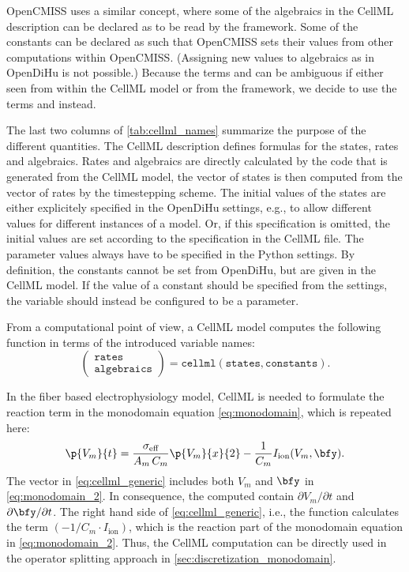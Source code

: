 OpenCMISS uses a similar concept, where some of the algebraics in the CellML description can be declared as  to be read by the framework. Some of the constants can be declared as  such that OpenCMISS sets their values from other computations within OpenCMISS. (Assigning new values to algebraics as in OpenDiHu is not possible.) Because the terms  and  can be ambiguous if either seen from within the CellML model or from the framework, we decide to use the terms  and  instead.

The last two columns of \cref{tab:cellml_names} summarize the purpose of the different quantities. The CellML description defines formulas for the states, rates and algebraics. Rates and algebraics are directly calculated by the code that is generated from the CellML model, the vector of states is then computed from the vector of rates by the timestepping scheme. The initial values of the states are either explicitely specified in the OpenDiHu settings, e.g., to allow different values for different instances of a model. Or, if this specification is omitted,  the initial values are set according to the specification in the CellML file. The parameter values always have to be specified in the Python settings. By definition, the constants cannot be set from OpenDiHu, but are given in the CellML model. If the value of a constant should be specified from the settings, the variable should instead be configured to be a parameter.


From a computational point of view, a CellML model computes the following function in terms of the introduced variable names:
\begin{equation}
  \left(
    \begin{array}{cc}
      \texttt{rates} \\ \texttt{algebraics} 
    \end{array}
  \right) = \texttt{cellml}\left(\texttt{states}, \texttt{constants}\right).
  \label{eq:cellml_generic}
\end{equation}

In the fiber based electrophysiology model, CellML is needed to formulate the reaction term in the monodomain equation \cref{eq:monodomain}, which is repeated here:
\begin{align}\label{eq:monodomain_2}
  \p{V_m}{t}  = \dfrac{\sigma_\text{eff}}{A_m\,C_m} \p{V_m}{x}{2} - \dfrac{1}{C_m} I_\text{ion}(V_m,\bfy).
\end{align}
The  vector in \cref{eq:cellml_generic} includes both $V_m$ and $\bfy$ in \cref{eq:monodomain_2}. In consequence, the computed  contain $\partial V_m/\partial t$ and $\partial\bfy/\partial t$. The right hand side of \cref{eq:cellml_generic}, i.e., the  function calculates the term $(-1/C_m \cdot I_\text{ion})$, which is the reaction part of the monodomain equation in \cref{eq:monodomain_2}. Thus, the CellML computation can be directly used in the operator splitting approach in \cref{sec:discretization_monodomain}.

